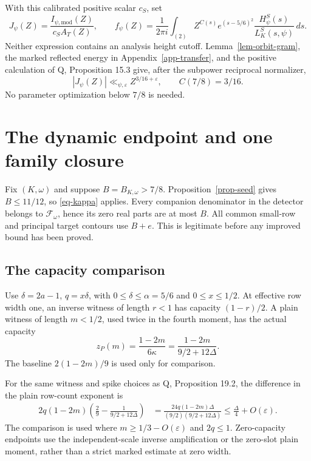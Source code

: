 \documentclass[11pt,a4paper]{article}
\theoremstyle{remark}\newtheorem{remark}[theorem]{Remark}
\newcommand{\eps}{\varepsilon}
\newcommand{\dd}{\,d}
\newcommand{\Packet}{\mathscr F_\omega}
\numberwithin{equation}{section}
\begin{document}
With this calibrated positive scalar $c_S$, set
\begin{equation}\label{eq-signal}
 J_\psi(Z)=\frac{I_{\psi,\mathrm{mod}}(Z)}{c_S A_T(Z)},
 \qquad
 f_\psi(Z)=\frac1{2\pi i}\int_{(2)}
     Z^{C(s)}e^{(s-5/6)^2}\frac{H_\psi^S(s)}{L_K^S(s,\psi)}\dd s.
\end{equation}
Neither expression contains an analysis height cutoff.
Lemma~\ref{lem-orbit-gram}, the marked reflected energy in
Appendix~\ref{app-transfer}, and the positive calculation of
Q, Proposition 15.3 give, after the subpower reciprocal normalizer,
\begin{equation}\label{eq-low}
 |J_\psi(Z)|\ll_{\psi,\eps}Z^{3/16+\eps},
 \qquad C(7/8)=3/16.
\end{equation}
No parameter optimization below $7/8$ is needed.


\section{The dynamic endpoint and one family closure}\label{sec-close}

Fix $(K,\omega)$ and suppose $B=B_{K,\omega}>7/8$.
Proposition~\ref{prop-seed} gives $B\le11/12$, so
\eqref{eq-kappa} applies. Every companion denominator in the
detector belongs to $\Packet$, hence its zero real parts are
at most $B$. All common small-row and principal target
contours use $B+e$. This is legitimate before any improved
bound has been proved.

\subsection{The capacity comparison}

Use $\delta=2a-1$, $q=x\delta$, with
$0\le\delta\le\alpha=5/6$ and $0\le x\le1/2$.
At effective row width one, an inverse witness of length $r<1$
has capacity $(1-r)/2$. A plain witness of length $m<1/2$,
used twice in the fourth moment, has the actual capacity
\begin{equation}\label{eq-dynamic-capacity}
 z_P(m)=\frac{1-2m}{6\kappa}
       =\frac{1-2m}{9/2+12\Delta}.
\end{equation}
The baseline $2(1-2m)/9$ is used only for comparison.

For the same witness and spike choices as Q, Proposition 19.2,
the difference in the plain row-count exponent is
\begin{align}\label{eq-capacity-cost}
 2q(1-2m)\left(\frac29-\frac1{9/2+12\Delta}\right)
 &=\frac{24q(1-2m)\Delta}{(9/2)(9/2+12\Delta)}
 \le\frac{\Delta}{4}+O(\eps).
\end{align}
The comparison is used where $m\ge1/3-O(\eps)$ and $2q\le1$.
Zero-capacity endpoints use the independent-scale inverse
amplification or the zero-slot plain moment, rather than a
strict marked estimate at zero width.
\end{document}
